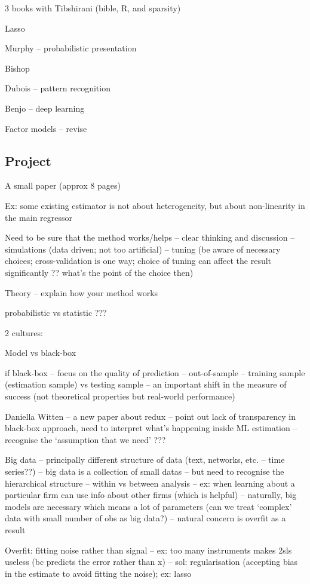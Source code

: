 \documentclass[a4paper,12pt,twoside]{article}
\begin{document}
3 books with Tibshirani (bible, R, and sparsity)

Lasso

Murphy -- probabilistic presentation

Bishop

Dubois -- pattern recognition


Benjo -- deep learning


Factor models -- revise


\subsection*{Project}

A small paper (approx 8 pages)

Ex: some existing estimator is not about heterogeneity, but about non-linearity in the main regressor

Need to be sure that the method works/helps -- clear thinking and discussion -- simulations (data driven; not too artificial) -- tuning (be aware of necessary choices; cross-validation is one way; choice of tuning can affect the result significantly ?? what's the point of the choice then)

Theory -- explain how your method works



probabilistic vs statistic ???

2 cultures:

Model vs black-box


if black-box -- focus on the quality of prediction -- out-of-sample -- training sample (estimation sample) vs testing sample -- an important shift in the measure of success (not theoretical properties but real-world performance)

Daniella Witten -- a new paper about redux -- point out lack of transparency in black-box approach, need to interpret what's happening inside ML estimation -- recognise the `assumption that we need' ???


Big data -- principally different structure of data (text, networks, etc. -- time series??) -- big data is a collection of small datas -- but need to recognise the hierarchical structure -- within vs between analysis -- ex: when learning about a particular firm can use info about other firms (which is helpful) -- naturally, big models are necessary which means a lot of parameters (can we treat `complex' data with small number of obs  as big data?) -- natural concern is overfit as a result

Overfit: fitting noise rather than signal -- ex: too many instruments makes 2sls useless (bc predicts the error rather than x) -- sol: regularisation (accepting bias in the estimate to avoid fitting the noise); ex: lasso
\end{document}
